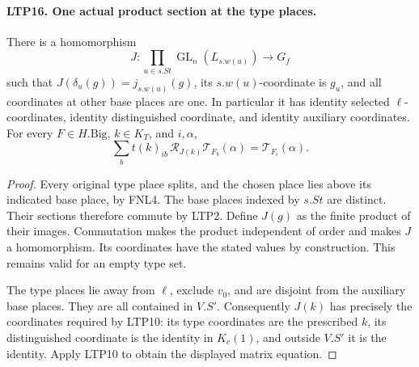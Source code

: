 \paragraph{LTP16. One actual product section at the type places.}
\label{claim:LTP16}
There is a homomorphism
\[
       J:\prod_{u\in s.St}\operatorname{GL}_n(L_{s.w(u)})
                                      \longrightarrow G_f
\]
such that \(J(\delta_u(g))=j_{s.w(u)}(g)\), its \(s.w(u)\)-coordinate
is \(g_u\), and all coordinates at other base places are one.
In particular it has identity selected \(\ell\)-coordinates,
identity distinguished coordinate, and identity auxiliary coordinates.
For every \(F\in H.\mathrm{Big}\), \(k\in K_T\), and \(i,\alpha\),
\[
       \sum_b t(k)_{ib}\,
               \mathscr R_{J(k)}\mathcal T_{F_b}(\alpha)
                          =\mathcal T_{F_i}(\alpha).
\]
\begin{proof}
Every original type place splits, and the chosen place lies above
its indicated base place, by FNL4.  The base places indexed by
\(s.St\) are distinct.  Their sections therefore commute by LTP2.
Define \(J(g)\) as the finite product of their images.
Commutation makes the product independent of order and makes
\(J\) a homomorphism.  Its coordinates have the stated values
by construction.  This remains valid for an empty type set.

The type places lie away from \(\ell\), exclude \(v_0\), and are
disjoint from the auxiliary base places.  They are all contained
in \(V.S'\).  Consequently \(J(k)\) has precisely the coordinates
required by LTP10: its type coordinates are the prescribed \(k\),
its distinguished coordinate is the identity in \(K_c(1)\), and
outside \(V.S'\) it is the identity.  Apply LTP10 to obtain the
displayed matrix equation.
\end{proof}

